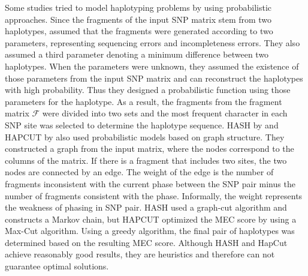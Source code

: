 Some studies tried to model haplotyping problems by using probabilistic approaches. 
Since the fragments of the input SNP matrix stem from two haplotypes, 
\cite{chen2008linear} assumed that the fragments were generated according to two parameters, representing sequencing errors and incompleteness errors.
They also assumed a third parameter denoting a minimum difference between two haplotypes.
When the parameters were unknown, they assumed the existence of those parameters from the input SNP matrix and can reconstruct the haplotypes with high probability.
Thus they designed a probabilistic function using those parameters for the haplotype. 
As a result, the fragments from the fragment matrix $\mathcal{F}$ were divided into two sets and the most frequent character 
in each SNP site was selected to determine the haplotype sequence. 
HASH by \cite{bansal2008mcmc} and HAPCUT by \cite{Bansal2008} also used probabilistic models based on graph structure. 
They constructed a graph from the input matrix, where the nodes correspond to the columns of the matrix. 
If there is a fragment that includes two sites, the two nodes are connected by an edge. 
The weight of the edge is the number of fragments inconsistent with the current phase between the SNP pair minus the number of fragments consistent with the phase.
Informally, the weight represents the weakness of phasing in SNP pair.
HASH used a graph-cut algorithm and constructs a Markov chain, 
but HAPCUT optimized the MEC score by using a Max-Cut algorithm. 
Using a greedy algorithm, the final pair of haplotypes was determined based on the resulting MEC score.
Although HASH and HapCut achieve reasonably good results, they are heuristics and therefore can not guarantee optimal solutions.

